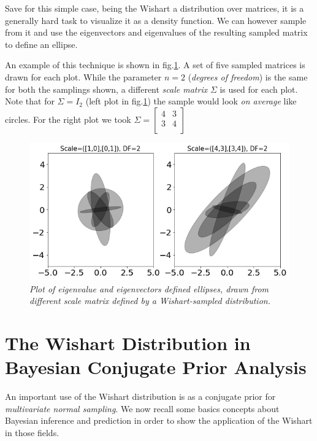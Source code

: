 \documentclass[12pt,openright,twoside,a4paper]{book}
\begin{document}
Save for this simple case, being the Wishart a distribution over matrices, it is a generally hard task to visualize it as a density function.
We can however sample from it and use the eigenvectors and eigenvalues of the resulting sampled matrix to define an ellipse.

An example of this technique is shown in fig.\ref{Wish-eig}. A set of five sampled matrices is drawn for each plot. While the parameter $n=2$ (\textit{degrees of freedom}) is the same for both the samplings shown, a different \textit{scale matrix} $\Sigma$ is used for each plot.
Note that for $\Sigma=I_2$ (left plot in fig.\ref{Wish-eig}) the sample would look \textit{on average} like circles. For the right plot we took $\Sigma=
\begin{bmatrix}
       4 & 3  \\
    	   3 & 4  \\ 	  
\end{bmatrix}$

\begin{figure}[!h]
\centering
\includegraphics[scale=0.37]{wisheig-df2}
\caption{\textit{Plot of eigenvalue and eigenvectors defined ellipses, drawn from different scale matrix defined by a Wishart-sampled distribution.}}
\label{Wish-eig}
\end{figure}

\section{The Wishart Distribution in Bayesian Conjugate Prior Analysis}

An important use of the Wishart distribution is as a conjugate prior for \textit{multivariate normal sampling}. We now recall some basics concepts about Bayesian inference and prediction in order to show the application of the Wishart in those fields.
\end{document}
